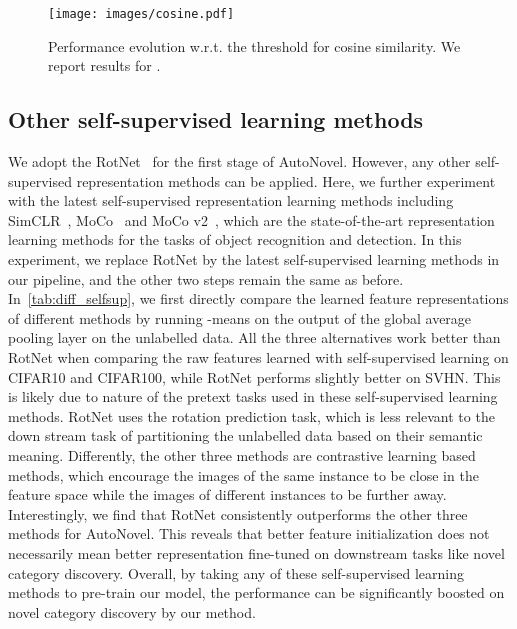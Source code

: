\begin{figure}[htb]
    \centering
    \texttt{[image: images/cosine.pdf]}
    \caption{Performance evolution w.r.t. the threshold   for cosine similarity. We report results for .}
    \label{fig:cosine}
\end{figure}


\subsection{Other self-supervised learning methods}

We adopt the RotNet~\cite{gidaris2018unsupervised} for the first stage of AutoNovel. However, any other self-supervised representation methods can be applied. Here, we further experiment with the latest self-supervised representation learning methods including SimCLR~\cite{chen2020simple}, MoCo~\cite{he2020moco} and MoCo v2~\cite{chen2020mocov2}, which are the state-of-the-art representation learning methods for the tasks of object recognition and detection.
In this experiment, we replace RotNet by the latest self-supervised learning methods in our pipeline, and the other two steps remain the same as before.
In~\cref{tab:diff_selfsup}, we first directly compare the learned feature representations of different methods by running -means on the output of the global average pooling layer on the unlabelled data.
All the three alternatives work better than RotNet when comparing the raw features learned with self-supervised learning on CIFAR10 and CIFAR100, while RotNet performs slightly better on SVHN\@.
This is likely due to nature of the pretext tasks used in these self-supervised learning methods.
RotNet uses the rotation prediction task, which is less relevant to the down stream task of partitioning the unlabelled data based on their semantic meaning.
Differently, the other three methods are contrastive learning based methods, which encourage the images of the same instance to be close in the feature space while the images of different instances to be further away.
Interestingly, we find that RotNet consistently outperforms the other three methods for AutoNovel.
This reveals that better feature initialization does not necessarily mean better representation fine-tuned on downstream tasks like novel category discovery.
Overall, by taking any of these self-supervised learning methods to pre-train our model, the performance can be significantly boosted on novel category discovery by our method.

